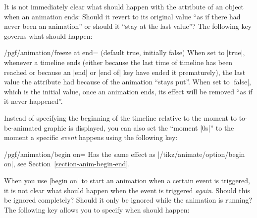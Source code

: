 It is not immediately clear what should happen with the attribute of an object
when an animation ends: Should it revert to its original value ``as if there
had never been an animation'' or should it ``stay at the last value''? The
following key governs what should happen:

\begin{key}{/pgf/animation/freeze at end= (default true, initially false)}
    When set to |true|, whenever a timeline ends (either because the last time
    of timeline has been reached or because an |end| or |end of| key have ended
    it prematurely), the last value the attribute had because of the animation
    ``stays put''. When set to |false|, which is the initial value, once an
    animation ends, its effect will be removed ``as if it never happened''.
\begin{codeexample}[
    preamble={\usepgfmodule{animations}},
    animation list={0,1,2,3,4},
]
\end{codeexample}
\begin{codeexample}[
    preamble={\usepgfmodule{animations}},
    animation list={0,1,2,3,4},
]
\end{codeexample}
\end{key}

Instead of specifying the beginning of the timeline relative to the moment to
to-be-animated graphic is displayed, you can also set the ``moment |0s|'' to
the moment a specific \emph{event} happens using the following key:

\begin{key}{/pgf/animation/begin on=}
    Has the same effect as |/tikz/animate/option/begin on|, see
    Section~\ref{section-anim-begin-end}.
\end{key}

When you use |begin on| to start an animation when a certain event is
triggered, it is not clear what should happen when the event is triggered
\emph{again}. Should this be ignored completely? Should it only be ignored
while the animation is running? The following key allows you to specify when
should happen:

